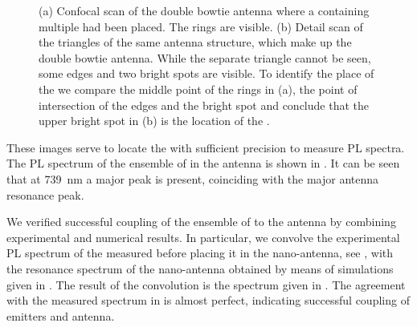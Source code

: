 \begin{figure}[!htb]
\begin{subfigure}{ 0.49\linewidth}
					\caption{}
					\label{subfig::antenna_bowtie_laser_scan}
				\end{subfigure}
				\caption[Confocal scan of a gold double bowtie antenna]{(a) Confocal scan of the double bowtie antenna where a \nd containing multiple \sivs had been placed. The rings are visible. (b) Detail scan of the triangles of the same antenna structure, which make up the double bowtie antenna. While the separate triangle cannot be seen, some edges and two bright spots are visible. To identify the place of the \nd we compare the middle point of the rings in (a), the point of intersection of the edges and the bright spot and conclude that the upper bright spot in (b) is the location of the \nd. }
			\end{figure}



			These images serve to locate the \nd with sufficient precision to measure PL spectra.
			The PL spectrum of the ensemble of \sivs in the antenna is shown in . It can be seen that at \SI{739}{\nm} a major peak is present, coinciding with the major antenna resonance peak.

			We verified successful coupling of the ensemble of \sivs to the antenna by combining experimental and numerical results. In particular, we convolve the experimental PL spectrum of the \nd measured before placing it in the nano-antenna, see ,  with the resonance spectrum of the nano-antenna obtained by means of simulations given in .
			The result of the convolution is the spectrum given in . The agreement with the measured spectrum in  is almost perfect, indicating successful coupling of emitters and antenna. 

